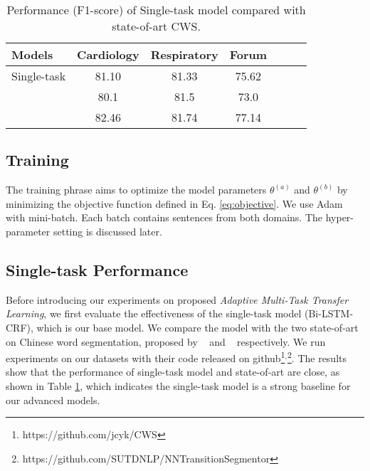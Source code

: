 \begin{table}[t!]
\small
\centering
\caption{Performance (F1-score) of Single-task model compared with state-of-art CWS.}\label{table:single-robust}
\begin{adjustbox}{width=7.7cm}
\begin{tabular}{lcccccc}
\hline
Models & Cardiology & Respiratory & Forum\\
\hline
Single-task & 81.10 & 81.33 & 75.62\\
~\cite{DBLP:journals/corr/CaiZ16} & 80.1 & 81.5 & 73.0\\
~\cite{DBLP:conf/acl/ZhangZF16} & 82.46 & 81.74 & 77.14 \\
\hline
\end{tabular}
\end{adjustbox}
\end{table}

\subsection{Training}

The training phrase aims to optimize the model parameters $\theta^{(a)}$ and $\theta^{(b)}$ by minimizing the objective function defined in Eq. \eqref{eq:objective}. We use Adam ~\cite{DBLP:journals/corr/KingmaB14} with mini-batch. Each batch contains sentences from both domains. The hyper-parameter setting is discussed later.

\subsection{Single-task Performance}\label{sec:single-robust}

Before introducing our experiments on proposed \textit{Adaptive Multi-Task Transfer Learning}, we first evaluate the effectiveness of the single-task model (Bi-LSTM-CRF), which is our base model. 
We compare the model with the two state-of-art on Chinese word segmentation, proposed by ~\citet{DBLP:journals/corr/CaiZ16} and ~\citet{DBLP:conf/acl/ZhangZF16} respectively. We run experiments on our datasets with their code released on github\footnote{https://github.com/jcyk/CWS}$^{,}$\footnote{https://github.com/SUTDNLP/NNTransitionSegmentor}. The results show that the performance of single-task model and state-of-art are close, as shown in Table \ref{table:single-robust}, which indicates the single-task model is a strong baseline for our advanced models. 

